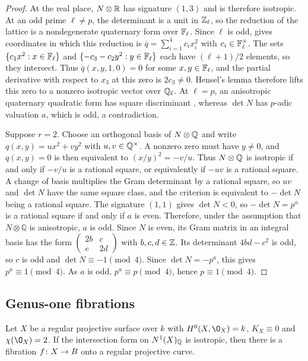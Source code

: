 \begin{proof}
At the real place, $N\otimes\mathbb{R}$ has signature $(1,3)$ and is therefore isotropic.
At an odd prime $\ell\neq p$, the determinant is a unit in $\mathbb{Z}_\ell$, so the reduction of the lattice is a nondegenerate quaternary form over $\mathbb{F}_\ell$.
Since $\ell$ is odd, \cite[Chapter~IV, Section~1.4, Theorem~1]{Ser73} gives coordinates in which this reduction is $\bar q = \sum_{i=1}^4 c_ix_i^2$ with $c_i\in\mathbb{F}_\ell^\times$.
The sets $\{c_1x^2:x\in\mathbb{F}_\ell\}$ and $\{-c_3-c_2y^2:y\in\mathbb{F}_\ell\}$ each have $(\ell+1)/2$ elements, so they intersect.
Thus $\bar q(x,y,1,0) = 0$ for some $x,y\in\mathbb{F}_\ell$, and the partial derivative with respect to $x_3$ at this zero is $2c_3\neq 0$.
Hensel's lemma therefore lifts this zero to a nonzero isotropic vector over $\mathbb{Q}_\ell$.
At $\ell = p$, an anisotropic quaternary quadratic form has square discriminant \cite[Chapter~IV, Section~2.2, Theorem~6(iii)]{Ser73}, whereas $\det N$ has $p$-adic valuation $a$, which is odd, a contradiction.

Suppose $r = 2$.
Choose an orthogonal basis of $N\otimes\mathbb{Q}$ and write $q(x,y) = ux^2+vy^2$ with $u,v\in\mathbb{Q}^\times$.
A nonzero zero must have $y\neq 0$, and $q(x,y) = 0$ is then equivalent to $(x/y)^2 = -v/u$.
Thus $N\otimes\mathbb{Q}$ is isotropic if and only if $-v/u$ is a rational square, or equivalently if $-uv$ is a rational square.
A change of basis multiplies the Gram determinant by a rational square, so $uv$ and $\det N$ have the same square class, and the criterion is equivalent to $-\det N$ being a rational square.
The signature $(1,1)$ gives $\det N<0$, so $-\det N = p^a$ is a rational square if and only if $a$ is even.
Therefore, under the assumption that $N \otimes \mathbb Q$ is anisotropic, $a$ is odd.
Since $N$ is even, its Gram matrix in an integral basis has the form $\begin{pmatrix}2b&c\\c&2d\end{pmatrix}$ with $b,c,d\in\mathbb{Z}$.
Its determinant $4bd-c^2$ is odd, so $c$ is odd and $\det N\equiv -1\pmod 4$.
Since $\det N = -p^a$, this gives $p^a\equiv 1\pmod 4$.
As $a$ is odd, $p^a\equiv p\pmod 4$, hence $p\equiv 1\pmod 4$.
\end{proof}


\subsection{Genus-one fibrations}
\begin{lemma}\label{lem:fibration}
Let $X$ be a regular projective surface over $k$ with $H^0(X,\O_X) = k$, $K_X\equiv 0$ and $\chi(\O_X) = 2$.
If the intersection form on $N^1(X)_{\mathbb{Q}}$ is isotropic, then there is a fibration $f\colon X\to B$ onto a regular projective curve.
\end{lemma}

